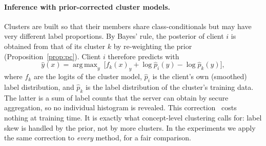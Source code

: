 \documentclass[pdflatex,sn-apa]{sn-jnl}
\theoremstyle{thmstyleone}
\theoremstyle{thmstylethree}
\DeclareMathOperator*{\argmax}{arg\,max}
\begin{document}
\paragraph{Inference with prior-corrected cluster models.}\label{sec:pc}
Clusters are built so that their members share class-conditionals but may have very different label proportions. By Bayes' rule, the posterior of client $i$ is obtained from that of its cluster $k$ by re-weighting the prior (Proposition~\ref{prop:pc}). Client $i$ therefore predicts with
\begin{equation}\label{eq:pc}
\hat y(x)=\argmax_y\ \big[f_k(x)_y+\log\hat p_i(y)-\log\hat p_k(y)\big],
\end{equation}
where $f_k$ are the logits of the cluster model, $\hat p_i$ is the client's own (smoothed) label distribution, and $\hat p_k$ is the label distribution of the cluster's training data. The latter is a sum of label counts that the server can obtain by secure aggregation, so no individual histogram is revealed. This correction~\citep{lipton2018labelshift,menon2021logit} costs nothing at training time. It is exactly what concept-level clustering calls for: label skew is handled by the prior, not by more clusters. In the experiments we apply the same correction to \emph{every} method, for a fair comparison.
\end{document}
